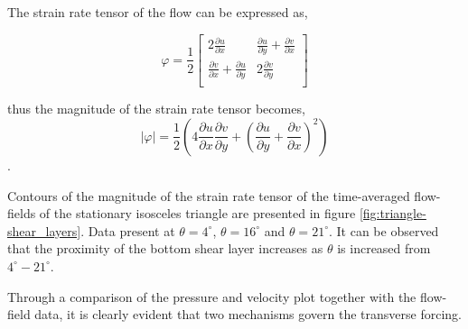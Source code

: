 The strain rate tensor of the flow can be expressed as,

\begin{equation}
\varphi = \frac{1}{2}
\begin{bmatrix}
2\frac{\partial u}{\partial x} & \frac{\partial u}{\partial y} + \frac{\partial v}{\partial x} \\
\frac{\partial v}{\partial x} + \frac{\partial u}{\partial y} & 2\frac{\partial v}{\partial y} \\
\end{bmatrix}
\end{equation}

thus the magnitude of the strain rate tensor becomes,
%
\begin{equation}
|\varphi| = \frac{1}{2}\left(4\frac{\partial u}{\partial x}\frac{\partial v}{\partial y} + \left(\frac{\partial u}{\partial y} + \frac{\partial v}{\partial x}\right)^2\right)
\end{equation}.




Contours of the magnitude of the strain rate tensor of the time-averaged flow-fields of the stationary isosceles triangle are presented in figure \ref{fig:triangle-shear_layers}. Data present at $\theta=4^{\circ}$, $\theta=16^{\circ}$ and $\theta=21^{\circ}$. It can be observed that the proximity of the bottom shear layer increases as $\theta$ is increased from $4^{\circ}-21^{\circ}$. 
%

Through a comparison of the pressure and velocity plot together with the flow-field data, it is clearly evident that two mechanisms govern the transverse forcing. 


